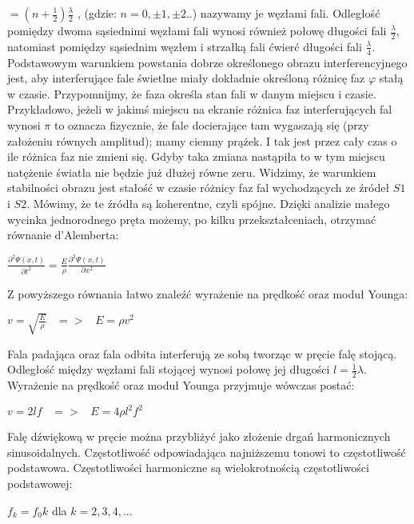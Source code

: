 \documentclass[12pt]{article}
\begin{document}
$=(n+\frac{1}{2})\frac{\lambda}{2}$ , (gdzie: $n = 0, \pm1, \pm2$..) nazywamy je węzłami fali. Odległość pomiędzy dwoma sąsiednimi węzłami fali wynosi również połowę długości fali $\frac{\lambda}{2}$, natomiast pomiędzy sąsiednim węzłem i strzałką fali ćwierć długości fali $\frac{\lambda}{4}$. \newline
Podstawowym warunkiem powstania dobrze określonego obrazu interferencyjnego jest, aby interferujące fale świetlne miały dokładnie określoną różnicę faz
$\varphi$ stałą w czasie. Przypomnijmy, że faza określa stan fali w danym miejscu i czasie. 
Przykładowo, jeżeli w jakimś miejscu na ekranie różnica faz interferujących fal wynosi $π$ to oznacza fizycznie, że fale docierające tam wygaszają się (przy założeniu równych amplitud); mamy ciemny prążek. I tak jest przez cały czas o ile różnica faz nie zmieni się. Gdyby taka zmiana nastąpiła to w tym miejscu natężenie światła nie będzie już dłużej równe zeru. Widzimy, że warunkiem stabilności obrazu jest stałość w czasie różnicy faz fal wychodzących ze źródeł $S1$ i $S2$. Mówimy, że te źródła są koherentne, czyli spójne. \newline
Dzięki analizie małego wycinka jednorodnego pręta możemy, po kilku przekształceniach, otrzymać równanie d'Alemberta:
\begin{center}
\Large $\frac{\partial^2\Psi(x,t)}{\partial{t^2}}=\frac{E}{\rho}\frac{\partial^2\Psi(x,t)}{\partial{x^2}}$
\end{center}
Z powyższego równania łatwo znaleźć wyrażenie na prędkość oraz moduł Younga:
\begin{center}
\Large $v=\sqrt{\frac{E}{\rho}}\;\;\;=>\;\;\;E=\rho{v^2}$
\end{center}
Fala padająca oraz fala odbita interferują ze sobą tworząc w pręcie falę stojącą. Odległość między węzłami fali stojącej wynosi połowę jej długości $l=\frac{1}{2}\lambda$. Wyrażenie na prędkość oraz moduł Younga przyjmuje wówczas postać:
\begin{center}
\Large $v=2lf\;\;\;=>\;\;\;E=4\rho{l}^2f^2$
\end{center}
Falę dźwiękową w pręcie można przybliżyć jako złożenie drgań harmonicznych sinusoidalnych. Częstotliwość odpowiadająca najniższemu tonowi to częstotliwość podstawowa. Częstotliwości harmoniczne są wielokrotnością częstotliwości podstawowej:
\begin{center}
\Large $f_k=f_0k$ dla $k=2,3,4,...$
\end{center}
\end{document}
